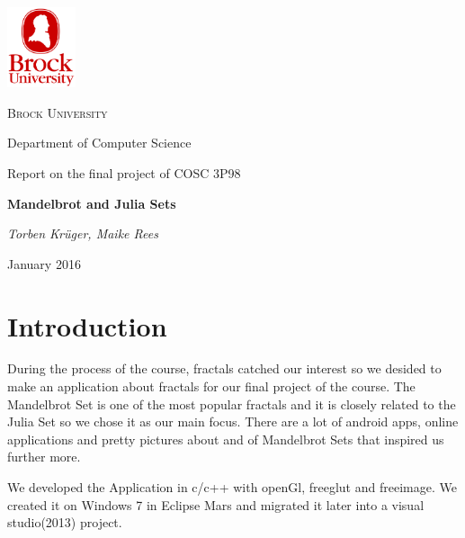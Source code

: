 \documentclass[final, paper=a4, paper=portrait, pagesize=auto, fontsize=10pt,english]{scrartcl}
\begin{document}
\begin{titlepage}
	\centering
	\includegraphics[width=0.15\textwidth]{brockLogo}\par\vspace{1cm}
	{\scshape\LARGE Brock University\par}
	\vspace{0.5cm}
	{\Large Department of Computer Science\par}
	\vspace{1cm}
	{\Large Report on the final project of COSC 3P98\par}
	\vspace{1.5cm}
	{\huge\bfseries Mandelbrot and Julia Sets\par}
	\vspace{2cm}
	{\Large\itshape Torben Krüger, Maike Rees\par}
	\vspace{2cm}	
	{\large January 2016\par}
\end{titlepage}

\newpage
 
\section{Introduction}
During the process of the course, fractals catched our interest so we desided to make an application about fractals for our final project of the course. The Mandelbrot Set is one of the most popular fractals and it is closely related to the Julia Set so we chose it as our main focus. There are a lot of android apps, online applications and pretty pictures about and of Mandelbrot Sets that inspired us further more. 

We developed the Application in c/c++ with openGl, freeglut and freeimage. We created it on Windows 7 in Eclipse Mars and migrated it later into a visual studio(2013) project.
\end{document}
